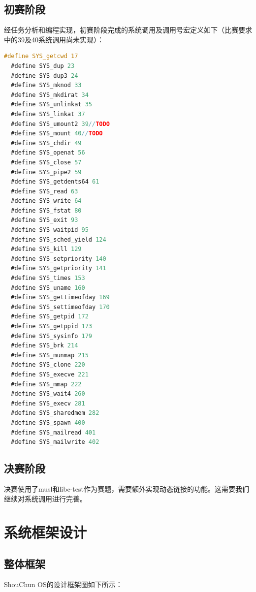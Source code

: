 \documentclass[UTF8,a4paper,10pt]{ctexart}
\begin{document}
\subsection{初赛阶段}

经任务分析和编程实现，初赛阶段完成的系统调用及调用号宏定义如下（比赛要求中的39及40系统调用尚未实现）：

\begin{lstlisting}[title=实现的系统调用及其系统调用号,frame=trbl,language={C}]
  #define SYS_getcwd 17
  #define SYS_dup 23
  #define SYS_dup3 24
  #define SYS_mknod 33
  #define SYS_mkdirat 34
  #define SYS_unlinkat 35
  #define SYS_linkat 37
  #define SYS_umount2 39//TODO
  #define SYS_mount 40//TODO
  #define SYS_chdir 49
  #define SYS_openat 56
  #define SYS_close 57
  #define SYS_pipe2 59
  #define SYS_getdents64 61
  #define SYS_read 63
  #define SYS_write 64
  #define SYS_fstat 80
  #define SYS_exit 93
  #define SYS_waitpid 95
  #define SYS_sched_yield 124
  #define SYS_kill 129
  #define SYS_setpriority 140
  #define SYS_getpriority 141
  #define SYS_times 153
  #define SYS_uname 160
  #define SYS_gettimeofday 169
  #define SYS_settimeofday 170
  #define SYS_getpid 172
  #define SYS_getppid 173
  #define SYS_sysinfo 179
  #define SYS_brk 214
  #define SYS_munmap 215
  #define SYS_clone 220
  #define SYS_execve 221
  #define SYS_mmap 222
  #define SYS_wait4 260
  #define SYS_execv 281
  #define SYS_sharedmem 282
  #define SYS_spawn 400
  #define SYS_mailread 401
  #define SYS_mailwrite 402
\end{lstlisting}

\subsection{决赛阶段}

决赛使用了musl和libc-test作为赛题，需要额外实现动态链接的功能。这需要我们
继续对系统调用进行完善。

\section{系统框架设计}

\subsection{整体框架}

ShouChun OS的设计框架图如下所示：
\end{document}
